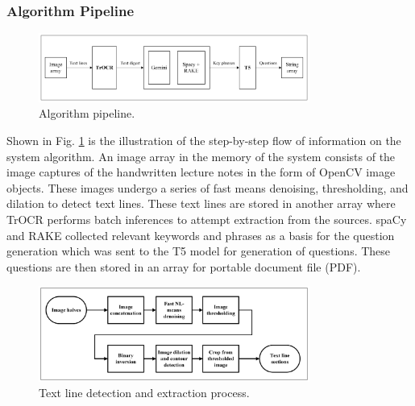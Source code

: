 \documentclass[conference]{IEEEtran}
\begin{document}
\subsubsection{Algorithm Pipeline}
\hfill
\begin{figure}[H]
\centerline{\includegraphics[width=3.5in]{pipeline.png}}
\vspace{-0.4cm}
\caption{Algorithm pipeline.} 
\label{pipeline}
\end{figure}
\indent Shown in Fig. \ref{pipeline} is the illustration 
of the step-by-step flow of information on the system 
algorithm. An image array in the memory of the system consists 
of the image captures of the handwritten lecture notes in the 
form of OpenCV image objects. These images undergo 
a series of fast means denoising, thresholding, and 
dilation to detect text lines. These text lines are stored in 
another array where TrOCR performs batch inferences to attempt 
extraction from the sources. spaCy and RAKE collected 
relevant keywords and phrases as a basis for the question generation 
which was sent to the T5 model for generation of questions. 
These questions are then stored in an array for portable document 
file (PDF).

\hfill
\begin{figure}[H]
\centerline{\includegraphics[width=3.5in]{ocr_process.png}}
\vspace{-0.4cm}
\caption{Text line detection and extraction process.} 
\label{ocr_process}
\end{figure}
\end{document}
